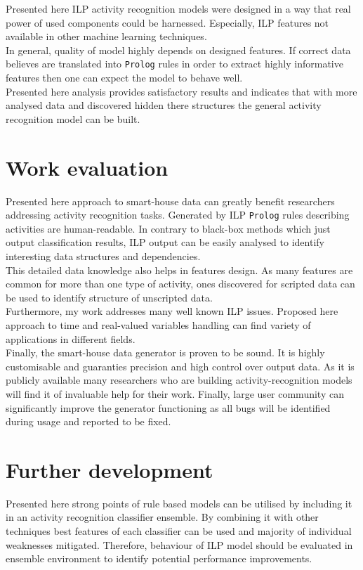\documentclass[11pt, a4paper, pdflatex, leqno, twoside, openright]{report}
\begin{document}
Presented here ILP activity recognition models were designed in a way that real power of used components could be harnessed. Especially, ILP features not available in other machine learning techniques.\\
In general, quality of model highly depends on designed features. If correct data believes are translated into \texttt{Prolog} rules in order to extract highly informative features then one can expect the model to behave well.\\
Presented here analysis provides satisfactory results and indicates that with more analysed data and discovered hidden there structures the general activity recognition model can be built.

  \section{Work evaluation} %
Presented here approach to smart-house data can greatly benefit researchers addressing activity recognition tasks. Generated by ILP \texttt{Prolog} rules describing activities are human-readable. In contrary to black-box methods which just output classification results, ILP output can be easily analysed to identify interesting data structures and dependencies.\\
This detailed data knowledge also helps in features design. As many features are common for more than one type of activity, ones discovered for scripted data can be used to identify structure of unscripted data.\\

Furthermore, my work addresses many well known ILP issues. Proposed here approach to time and real-valued variables handling can find variety of applications in different fields.\\

Finally, the smart-house data generator is proven to be sound. It is highly customisable and guaranties precision and high control over output data. As it is publicly available many researchers who are building activity-recognition models will find it of invaluable help for their work. Finally, large user community can significantly improve the generator functioning as all bugs will be identified during usage and reported to be fixed.

  \section{Further development}
Presented here strong points of rule based models can be utilised by including it in an activity recognition classifier ensemble. By combining it with other techniques best features of each classifier can be used and majority of individual weaknesses mitigated. Therefore, behaviour of ILP model should be evaluated in ensemble environment to identify potential performance improvements.
\end{document}
